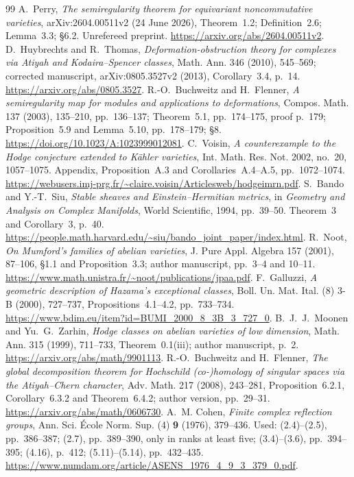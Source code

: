 \documentclass[11pt]{article}
\theoremstyle{definition}
\theoremstyle{remark}
\begin{document}
\begin{thebibliography}{99}
 A.~Perry, \emph{The semiregularity theorem for equivariant noncommutative varieties}, arXiv:2604.00511v2 (24 June 2026), Theorem~1.2; Definition~2.6; Lemma~3.3; \S6.2. Unrefereed preprint. \url{https://arxiv.org/abs/2604.00511v2}.
 D.~Huybrechts and R.~Thomas, \emph{Deformation-obstruction theory for complexes via Atiyah and Kodaira--Spencer classes}, Math. Ann. 346 (2010), 545--569; corrected manuscript, arXiv:0805.3527v2 (2013), Corollary~3.4, p.~14. \url{https://arxiv.org/abs/0805.3527}.
 R.-O.~Buchweitz and H.~Flenner, \emph{A semiregularity map for modules and applications to deformations}, Compos. Math. 137 (2003), 135--210, pp.~136--137; Theorem~5.1, pp.~174--175, proof p.~179; Proposition~5.9 and Lemma~5.10, pp.~178--179; \S8. \url{https://doi.org/10.1023/A:1023999012081}.
 C.~Voisin, \emph{A counterexample to the Hodge conjecture extended to Kähler varieties}, Int. Math. Res. Not. 2002, no.~20, 1057--1075. Appendix, Proposition~A.3 and Corollaries~A.4--A.5, pp.~1072--1074. \url{https://webusers.imj-prg.fr/~claire.voisin/Articlesweb/hodgeimrn.pdf}.
 S.~Bando and Y.-T.~Siu, \emph{Stable sheaves and Einstein--Hermitian metrics}, in \emph{Geometry and Analysis on Complex Manifolds}, World Scientific, 1994, pp.~39--50. Theorem~3 and Corollary~3, p.~40. \url{https://people.math.harvard.edu/~siu/bando_joint_paper/index.html}.
 R.~Noot, \emph{On Mumford's families of abelian varieties}, J. Pure Appl. Algebra 157 (2001), 87--106, \S1.1 and Proposition~3.3; author manuscript, pp.~3--4 and 10--11. \url{https://www.math.unistra.fr/~noot/publications/jpaa.pdf}.
 F.~Galluzzi, \emph{A geometric description of Hazama's exceptional classes}, Boll. Un. Mat. Ital. (8) 3-B (2000), 727--737, Propositions~4.1--4.2, pp.~733--734. \url{https://www.bdim.eu/item?id=BUMI_2000_8_3B_3_727_0}.
 B.~J.~J.~Moonen and Yu.~G.~Zarhin, \emph{Hodge classes on abelian varieties of low dimension}, Math. Ann. 315 (1999), 711--733, Theorem~0.1(iii); author manuscript, p.~2. \url{https://arxiv.org/abs/math/9901113}.
 R.-O.~Buchweitz and H.~Flenner, \emph{The global decomposition theorem for Hochschild (co-)homology of singular spaces via the Atiyah--Chern character}, Adv. Math. 217 (2008), 243--281, Proposition~6.2.1, Corollary~6.3.2 and Theorem~6.4.2; author version, pp.~29--31. \url{https://arxiv.org/abs/math/0606730}.
A.~M. Cohen, \emph{Finite complex reflection groups},
Ann. Sci. \'Ecole Norm. Sup. (4) \textbf{9} (1976), 379--436.
Used: (2.4)--(2.5), pp.~386--387; (2.7), pp.~389--390,
only in ranks at least five; (3.4)--(3.6), pp.~394--395;
(4.16), p.~412; (5.11)--(5.14), pp.~432--435.
\url{https://www.numdam.org/article/ASENS_1976_4_9_3_379_0.pdf}.


\end{thebibliography}
\end{document}
